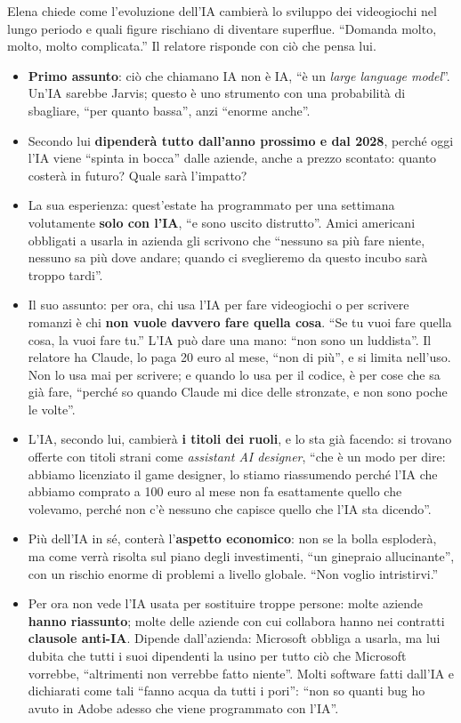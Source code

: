 Elena chiede come l'evoluzione dell'IA cambierà lo sviluppo dei videogiochi
nel lungo periodo e quali figure rischiano di diventare superflue.
``Domanda molto, molto, molto complicata.'' Il relatore risponde con ciò che
pensa lui.
\begin{itemize}
  \item \textbf{Primo assunto}: ciò che chiamano IA non è IA, ``è un
        \emph{large language model}''. Un'IA sarebbe Jarvis; questo è uno
        strumento con una probabilità di sbagliare, ``per quanto bassa'', anzi
        ``enorme anche''.
  \item Secondo lui \textbf{dipenderà tutto dall'anno prossimo e dal 2028},
        perché oggi l'IA viene ``spinta in bocca'' dalle aziende, anche a
        prezzo scontato: quanto costerà in futuro? Quale sarà l'impatto?
  \item La sua esperienza: quest'estate ha programmato per una settimana
        volutamente \textbf{solo con l'IA}, ``e sono uscito distrutto''. Amici
        americani obbligati a usarla in azienda gli scrivono che ``nessuno sa
        più fare niente, nessuno sa più dove andare; quando ci sveglieremo da
        questo incubo sarà troppo tardi''.
  \item Il suo assunto: per ora, chi usa l'IA per fare videogiochi o per
        scrivere romanzi è chi \textbf{non vuole davvero fare quella cosa}.
        ``Se tu vuoi fare quella cosa, la vuoi fare tu.'' L'IA può dare una
        mano: ``non sono un luddista''. Il relatore ha Claude, lo paga 20 euro
        al mese, ``non di più'', e si limita nell'uso. Non lo usa mai per
        scrivere; e quando lo usa per il codice, è per cose che sa già fare,
        ``perché so quando Claude mi dice delle stronzate, e non sono poche le
        volte''.
  \item L'IA, secondo lui, cambierà \textbf{i titoli dei ruoli}, e lo sta già
        facendo: si trovano offerte con titoli strani come \emph{assistant AI
        designer}, ``che è un modo per dire: abbiamo licenziato il game
        designer, lo stiamo riassumendo perché l'IA che abbiamo comprato a 100
        euro al mese non fa esattamente quello che volevamo, perché non c'è
        nessuno che capisce quello che l'IA sta dicendo''.
  \item Più dell'IA in sé, conterà l'\textbf{aspetto economico}: non se la
        bolla esploderà, ma come verrà risolta sul piano degli investimenti,
        ``un ginepraio allucinante'', con un rischio enorme di problemi a
        livello globale. ``Non voglio intristirvi.''
  \item Per ora non vede l'IA usata per sostituire troppe persone: molte
        aziende \textbf{hanno riassunto}; molte delle aziende con cui
        collabora hanno nei contratti \textbf{clausole anti-IA}. Dipende
        dall'azienda: Microsoft obbliga a usarla, ma lui dubita che tutti i
        suoi dipendenti la usino per tutto ciò che Microsoft vorrebbe,
        ``altrimenti non verrebbe fatto niente''. Molti software fatti dall'IA
        e dichiarati come tali ``fanno acqua da tutti i pori'': ``non so
        quanti bug ho avuto in Adobe adesso che viene programmato con l'IA''.
\end{itemize}

